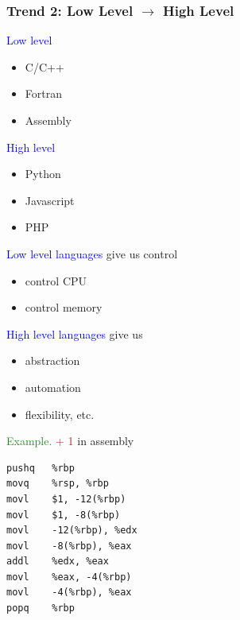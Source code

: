 \documentclass[
    xcolor={svgnames,dvipsnames},
    hyperref={colorlinks, citecolor=DeepPink4, linkcolor=DarkRed, urlcolor=DarkBlue}
    ]{beamer}  %
\newcommand{\Eg}{\textcolor{ForestGreen}{Example. }}
\newcommand{\brown}[1]{\textcolor{Brown}{\sf #1}}
\newcommand{\blue}[1]{\textcolor{Blue}{\sf #1}}
\newcommand{\1}{\mathbbm 1}
\begin{document}
\begin{frame}
    \frametitle{Trend 2: Low Level $\to$ High Level}
    
    \blue{Low level} 
    
    \begin{itemize}
        \item C/C++
        \item Fortran
        \item Assembly
    \end{itemize}

    \vspace{1em}

    \blue{High level } 

    \begin{itemize}
        \item Python
        \item Javascript
        \item PHP
    \end{itemize}

\end{frame}


\begin{frame}
    
    \blue{Low level languages} give us control 

    \begin{itemize}
        \item control CPU
        \item control memory
    \end{itemize}

    \vspace{0.5em}
    \vspace{0.5em}
    \vspace{0.5em}

    \blue{High level languages} give us 
    \begin{itemize}
        \item abstraction
        \item automation
        \item flexibility, etc.
    \end{itemize}

\end{frame}




\begin{frame}[fragile]

    \Eg \brown{1 + 1} in assembly

    {\small
    \begin{verbatim}
pushq   %rbp
movq    %rsp, %rbp
movl    $1, -12(%rbp)
movl    $1, -8(%rbp)
movl    -12(%rbp), %edx
movl    -8(%rbp), %eax
addl    %edx, %eax
movl    %eax, -4(%rbp)
movl    -4(%rbp), %eax
popq    %rbp
    \end{verbatim}
    }

\end{frame}
\end{document}
